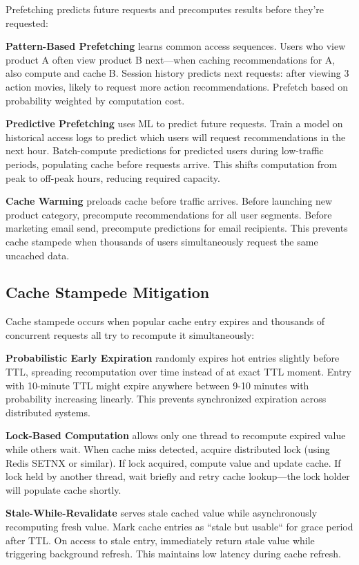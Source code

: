 Prefetching predicts future requests and precomputes results before they're requested:

\textbf{Pattern-Based Prefetching} learns common access sequences. Users who view product A often view product B next---when caching recommendations for A, also compute and cache B. Session history predicts next requests: after viewing 3 action movies, likely to request more action recommendations. Prefetch based on probability weighted by computation cost.

\textbf{Predictive Prefetching} uses ML to predict future requests. Train a model on historical access logs to predict which users will request recommendations in the next hour. Batch-compute predictions for predicted users during low-traffic periods, populating cache before requests arrive. This shifts computation from peak to off-peak hours, reducing required capacity.

\textbf{Cache Warming} preloads cache before traffic arrives. Before launching new product category, precompute recommendations for all user segments. Before marketing email send, precompute predictions for email recipients. This prevents cache stampede when thousands of users simultaneously request the same uncached data.

\subsection{Cache Stampede Mitigation}

Cache stampede occurs when popular cache entry expires and thousands of concurrent requests all try to recompute it simultaneously:

\textbf{Probabilistic Early Expiration} randomly expires hot entries slightly before TTL, spreading recomputation over time instead of at exact TTL moment. Entry with 10-minute TTL might expire anywhere between 9-10 minutes with probability increasing linearly. This prevents synchronized expiration across distributed systems.

\textbf{Lock-Based Computation} allows only one thread to recompute expired value while others wait. When cache miss detected, acquire distributed lock (using Redis SETNX or similar). If lock acquired, compute value and update cache. If lock held by another thread, wait briefly and retry cache lookup---the lock holder will populate cache shortly.

\textbf{Stale-While-Revalidate} serves stale cached value while asynchronously recomputing fresh value. Mark cache entries as ``stale but usable`` for grace period after TTL. On access to stale entry, immediately return stale value while triggering background refresh. This maintains low latency during cache refresh.

